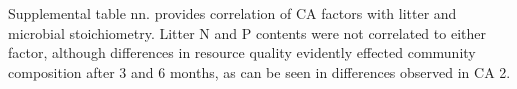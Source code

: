 Supplemental table nn. provides correlation of CA factors with litter and microbial stoichiometry. Litter N and P contents were not correlated to either factor, although differences in resource quality evidently effected community composition after 3 and 6 months, as can be seen in differences observed in CA 2. 

